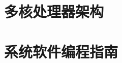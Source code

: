 \documentclass[a4paper,adobefonts]{ctexbook}
\begin{document}


\tableofcontents
\listoffigures
\listoftables

\part{多核处理器架构}










\part{系统软件编程指南}







\end{document}
